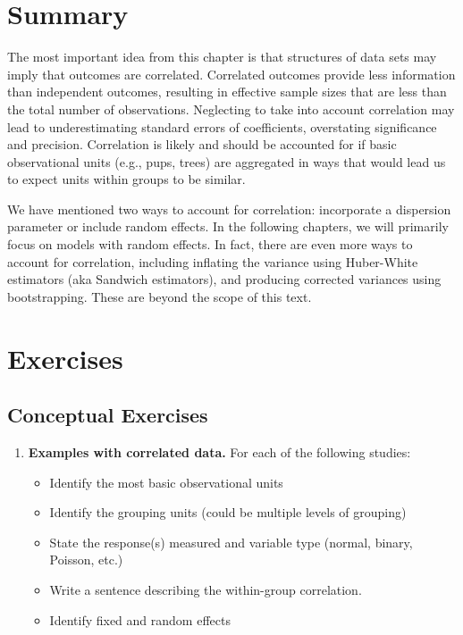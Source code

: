 \documentclass[
]{krantz}
\providecommand{\tightlist}{%
  \setlength{\itemsep}{0pt}\setlength{\parskip}{0pt}}
\begin{document}
\section{Summary}\label{summary-2}

The most important idea from this chapter is that structures of data sets may imply that outcomes are correlated. Correlated outcomes provide less information than independent outcomes, resulting in effective sample sizes that are less than the total number of observations. Neglecting to take into account correlation may lead to underestimating standard errors of coefficients, overstating significance and precision. Correlation is likely and should be accounted for if basic observational units (e.g., pups, trees) are aggregated in ways that would lead us to expect units within groups to be similar.

We have mentioned two ways to account for correlation: incorporate a dispersion parameter or include random effects. In the following chapters, we will primarily focus on models with random effects. In fact, there are even more ways to account for correlation, including inflating the variance using Huber-White estimators (aka Sandwich estimators), and producing corrected variances using bootstrapping. These are beyond the scope of this text.

\section{Exercises}\label{exercises-6}

\subsection{Conceptual Exercises}\label{conceptual-exercises-4}

\begin{enumerate}
\def\labelenumi{\arabic{enumi}.}
\tightlist
\item
  \textbf{Examples with correlated data.} For each of the following studies:

  \begin{itemize}
  \tightlist
  \item
    Identify the most basic observational units
  \item
    Identify the grouping units (could be multiple levels of grouping)
  \item
    State the response(s) measured and variable type (normal, binary, Poisson, etc.)
  \item
    Write a sentence describing the within-group correlation.
  \item
    Identify fixed and random effects
  \end{itemize}
\end{enumerate}
\end{document}
